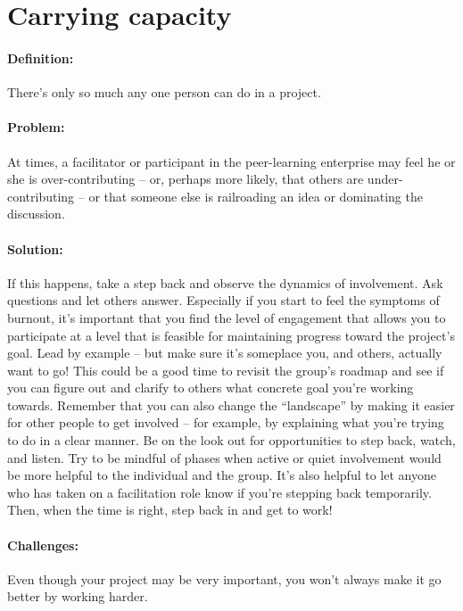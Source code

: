 \section{Carrying capacity}
\paragraph{Definition:} There's only so much any one person can do in a
project.

\paragraph{Problem:} At times, a facilitator or participant in the
peer-learning enterprise may feel he or she is over-contributing -- or,
perhaps more likely, that others are under-contributing -- or that
someone else is railroading an idea or dominating the discussion.

\paragraph{Solution:} If this happens, take a step back and observe the
dynamics of involvement. Ask questions and let others answer. Especially
if you start to feel the symptoms of burnout, it's important that you
find the level of engagement that allows you to participate at a level
that is feasible for maintaining progress toward the project's goal.
Lead by example -- but make sure it's someplace you, and others,
actually want to go! This could be a good time to revisit the group's
roadmap and see if you can figure out and clarify to others what
concrete goal you're working towards. Remember that you can also change
the ``landscape'' by making it easier for other people to get involved
-- for example, by explaining what you're trying to do in a clear
manner. Be on the look out for opportunities to step back, watch, and
listen. Try to be mindful of phases when active or quiet involvement
would be more helpful to the individual and the group. It's also helpful
to let anyone who has taken on a facilitation role know if you're
stepping back temporarily. Then, when the time is right, step back in
and get to work!

\paragraph{Challenges:} Even though your project may be very important, you
won't always make it go better by working harder.

